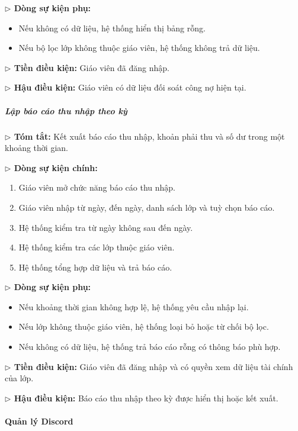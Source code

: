 \documentclass[12pt,a4paper]{article}
\begin{document}
\textbf{$\triangleright$ Dòng sự kiện phụ:}
\begin{itemize}[leftmargin=*]
\item Nếu không có dữ liệu, hệ thống hiển thị bảng rỗng.
\item Nếu bộ lọc lớp không thuộc giáo viên, hệ thống không trả dữ liệu.
\end{itemize}

\textbf{$\triangleright$ Tiền điều kiện:} Giáo viên đã đăng nhập.

\textbf{$\triangleright$ Hậu điều kiện:} Giáo viên có dữ liệu đối soát công nợ hiện tại.

\subparagraph{Lập báo cáo thu nhập theo kỳ}
\textbf{$\triangleright$ Tóm tắt:} Kết xuất báo cáo thu nhập, khoản phải thu và số dư trong một khoảng thời gian.

\textbf{$\triangleright$ Dòng sự kiện chính:}
\begin{enumerate}[leftmargin=*]
\item Giáo viên mở chức năng báo cáo thu nhập.
\item Giáo viên nhập từ ngày, đến ngày, danh sách lớp và tuỳ chọn báo cáo.
\item Hệ thống kiểm tra từ ngày không sau đến ngày.
\item Hệ thống kiểm tra các lớp thuộc giáo viên.
\item Hệ thống tổng hợp dữ liệu và trả báo cáo.
\end{enumerate}

\textbf{$\triangleright$ Dòng sự kiện phụ:}
\begin{itemize}[leftmargin=*]
\item Nếu khoảng thời gian không hợp lệ, hệ thống yêu cầu nhập lại.
\item Nếu lớp không thuộc giáo viên, hệ thống loại bỏ hoặc từ chối bộ lọc.
\item Nếu không có dữ liệu, hệ thống trả báo cáo rỗng có thông báo phù hợp.
\end{itemize}

\textbf{$\triangleright$ Tiền điều kiện:} Giáo viên đã đăng nhập và có quyền xem dữ liệu tài chính của lớp.

\textbf{$\triangleright$ Hậu điều kiện:} Báo cáo thu nhập theo kỳ được hiển thị hoặc kết xuất.

\paragraph{Quản lý Discord}
\end{document}
